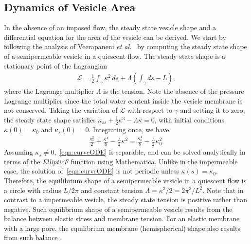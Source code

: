 \documentclass[prb,preprint,showpacs,preprintnumbers,amsmath,amssymb,longbibliography]{revtex4-1}
\begin{document}
\subsection{Dynamics of Vesicle Area\label{subsec:area_dynamics}}
In the absence of an imposed flow, the steady state vesicle shape and a
differential equation for the area of the vesicle can be derived. We
start by following the analysis of Veerapaneni {\em et
al.}~\cite{vee-raj-bir-pur2009} by computing the steady state shape of a
semipermeable vesicle in a quiescent flow. The steady state shape is a
stationary point of the Lagrangian
\begin{align}
  \mathcal{L} = \frac{1}{2}\int_{\gamma} \kappa^2 \, ds +
    \Lambda \left(\int_{\gamma} ds  - L \right),
\end{align}
where the Lagrange multiplier $\Lambda$ is the tension. Note the absence
of the pressure Lagrange multiplier since the total water content inside the vesicle membrane is not conserved.
Taking the variation of $\mathcal{L}$ with respect to $\gamma$ and
setting it to zero, the steady state shape satisfies $\kappa_{ss} +
\frac{1}{2}\kappa^3 - \Lambda \kappa = 0$, with initial conditions
$\kappa(0) = \kappa_0$ and $\kappa_s(0) = 0$.  Integrating once, we have
\begin{align}
  \frac{\kappa_s^2}{2} + \frac{\kappa^4}{8} - 
    \frac{\Lambda}{2}\kappa^2 = \frac{\kappa_0^4}{8} - 
    \frac{\Lambda}{2}\kappa_0^2.
  \label{eqn:curveODE}
\end{align}
Assuming $\kappa_s \neq 0$,~\eqref{eqn:curveODE} is separable, and can
be solved analytically in terms of the {\em EllipticF} function using
Mathematica. Unlike in the impermeable case, the solution
of~\eqref{eqn:curveODE} is not periodic unless $\kappa(s) = \kappa_0$.
Therefore, the equilibrium shape of a semipermeable vesicle in a
quiescent flow is a circle with radius $L/2\pi$ and constant tension
$\Lambda = \kappa^2/2 = 2\pi^2/L^2.$ Note that in contrast to a
impermeable vesicle, the steady state tension is positive rather than
negative. Such equilibrium shape of a semipermeable vesicle results from the balance between elastic stress and membrane tension. 
For an elastic membrane with a large pore, the equilibrium membrane (hemispherical) shape also results from such balance \cite{Ryham2018_JFM}.
\end{document}
